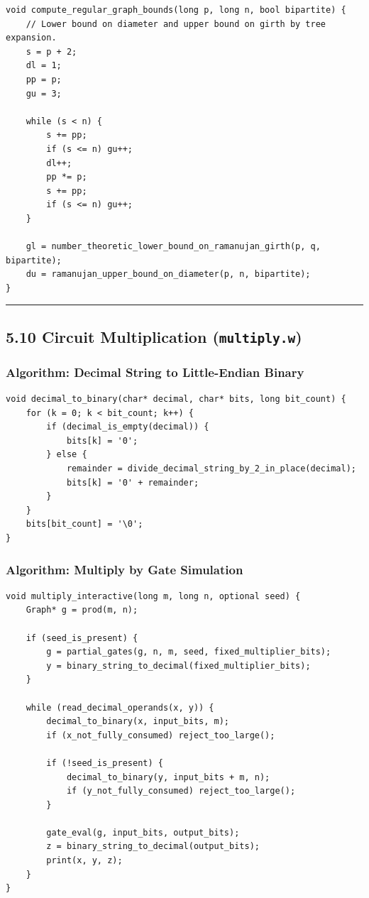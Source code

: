 \documentclass[11pt]{article}
\begin{document}
\begin{verbatim}
void compute_regular_graph_bounds(long p, long n, bool bipartite) {
    // Lower bound on diameter and upper bound on girth by tree expansion.
    s = p + 2;
    dl = 1;
    pp = p;
    gu = 3;

    while (s < n) {
        s += pp;
        if (s <= n) gu++;
        dl++;
        pp *= p;
        s += pp;
        if (s <= n) gu++;
    }

    gl = number_theoretic_lower_bound_on_ramanujan_girth(p, q, bipartite);
    du = ramanujan_upper_bound_on_diameter(p, n, bipartite);
}
\end{verbatim}

\begin{center}\rule{0.5\linewidth}{0.5pt}\end{center}

\subsection{\texorpdfstring{5.10 Circuit Multiplication (\texttt{multiply.w})}{5.10 Circuit Multiplication (multiply.w)}}\label{circuit-multiplication-multiply.w}

\subsubsection{Algorithm: Decimal String to Little-Endian Binary}\label{algorithm-decimal-string-to-little-endian-binary}

\begin{verbatim}
void decimal_to_binary(char* decimal, char* bits, long bit_count) {
    for (k = 0; k < bit_count; k++) {
        if (decimal_is_empty(decimal)) {
            bits[k] = '0';
        } else {
            remainder = divide_decimal_string_by_2_in_place(decimal);
            bits[k] = '0' + remainder;
        }
    }
    bits[bit_count] = '\0';
}
\end{verbatim}

\subsubsection{Algorithm: Multiply by Gate Simulation}\label{algorithm-multiply-by-gate-simulation}

\begin{verbatim}
void multiply_interactive(long m, long n, optional seed) {
    Graph* g = prod(m, n);

    if (seed_is_present) {
        g = partial_gates(g, n, m, seed, fixed_multiplier_bits);
        y = binary_string_to_decimal(fixed_multiplier_bits);
    }

    while (read_decimal_operands(x, y)) {
        decimal_to_binary(x, input_bits, m);
        if (x_not_fully_consumed) reject_too_large();

        if (!seed_is_present) {
            decimal_to_binary(y, input_bits + m, n);
            if (y_not_fully_consumed) reject_too_large();
        }

        gate_eval(g, input_bits, output_bits);
        z = binary_string_to_decimal(output_bits);
        print(x, y, z);
    }
}
\end{verbatim}
\end{document}
